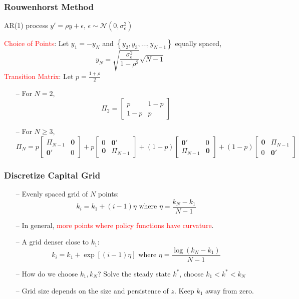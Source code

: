 \documentclass[aspectratio=169, 11pt]{beamer}
\begin{document}
\begin{frame}
\frametitle{Rouwenhorst Method}
  AR(1) process $y'=\rho y+\epsilon $, $\epsilon \sim \mathcal{N}\left(0,\sigma^2_{\epsilon}\right)$ \\
  \bigskip

  \textcolor{red}{Choice of Points}: Let $y_{1}=-y_{N}$ and $\left\{ y_{2},y_{3},\ldots,y_{N-1}\right\}$ equally spaced,
  \[
    y_{N}=\sqrt{\frac{\sigma_{\epsilon}^{2}}{1-\rho^{2}}}\sqrt{N-1}
  \]
  \bigskip
  \textcolor{red}{Transition Matrix}: Let $p=\frac{1+\rho}{2}$
  \begin{itemize}
    \item[--] For $N=2$,
    \[
      \Pi_{2}=\left[\begin{array}{cc}
      p & 1-p\\
      1-p & p
      \end{array}\right]
    \]
    \item[--] For $N\geqslant3$,
    \[
      \Pi_{N}=p\left[\begin{array}{cc}
      \Pi_{N-1} & \mathbf{0}\\
      \mathbf{0}' & 0
      \end{array}\right]+p\left[\begin{array}{cc}
      0 & \mathbf{0}'\\
      \mathbf{0} & \Pi_{N-1}
      \end{array}\right]+\left(1-p\right)\left[\begin{array}{cc}
      \mathbf{0}' & 0\\
      \Pi_{N-1} & \mathbf{0}
      \end{array}\right]+\left(1-p\right)\left[\begin{array}{cc}
      \mathbf{0} & \Pi_{N-1}\\
      0 & \mathbf{0}'
      \end{array}\right]
    \]
  \end{itemize}
\end{frame}

\begin{frame}
\frametitle{Discretize Capital Grid}
  \begin{itemize}
    \item[--] Evenly spaced grid of $N$ points:
    \[
      k_{i}=k_{1}+\left(i-1\right)\eta\text{ where }\eta=\frac{k_{N}-k_{1}}{N-1}
    \]
    \item[--] In general, \textcolor{red}{more points where policy functions have curvature}.
    \item[--] A grid denser close to $k_{1}$:
    \[
      k_{i}=k_{1}+\exp\left[\left(i-1\right)\eta\right]\text{ where }\eta=\frac{\log\left(k_{N}-k_{1}\right)}{N-1}
    \]
    \item[--] How do we choose $k_{1},k_{N}$? Solve the steady state $k^{*}$, choose $k_{1}<k^{*}<k_{N}$
    \item[--] Grid size depends on the size and persistence of $z$. Keep $k_{1}$ away from zero.
  \end{itemize}
\end{frame}
\end{document}
